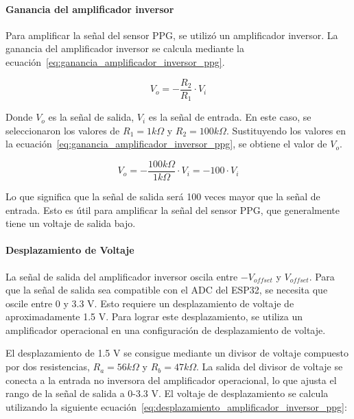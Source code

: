         \paragraph{Ganancia del amplificador inversor}
        Para amplificar la señal del sensor PPG, se utilizó un amplificador inversor. La ganancia del amplificador inversor se calcula mediante la ecuación~\ref{eq:ganancia_amplificador_inversor_ppg}.

        \begin{equation}
            \label{eq:ganancia_amplificador_inversor_ppg}
            V_o = - \frac{R_2}{R_1} \cdot V_i
        \end{equation}

        Donde $V_o$ es la señal de salida, $V_i$ es la señal de entrada. En este caso, se seleccionaron los valores de $R_1 = 1 k\Omega$ y $R_2 = 100 k\Omega$. Sustituyendo los valores en la ecuación~\ref{eq:ganancia_amplificador_inversor_ppg}, se obtiene el valor de $V_o$.

        \begin{equation}
            \label{eq:ganancia_amplificador_inversor_ppg_valor}
            V_o = - \frac{100k\Omega}{1k\Omega} \cdot V_i = -100 \cdot V_i
        \end{equation}

        Lo que significa que la señal de salida será 100 veces mayor que la señal de entrada. Esto es útil para amplificar la señal del sensor PPG, que generalmente tiene un voltaje de salida bajo.

        \paragraph{Desplazamiento de Voltaje}  
        La señal de salida del amplificador inversor oscila entre $-V_{offset}$ y $V_{offset}$. Para que la señal de salida sea compatible con el ADC del ESP32, se necesita que oscile entre 0 y 3.3 V. Esto requiere un desplazamiento de voltaje de aproximadamente 1.5 V. Para lograr este desplazamiento, se utiliza un amplificador operacional en una configuración de desplazamiento de voltaje. 

        El desplazamiento de 1.5 V se consigue mediante un divisor de voltaje compuesto por dos resistencias, $R_a = 56k\Omega$ y $R_b = 47k\Omega$. La salida del divisor de voltaje se conecta a la entrada no inversora del amplificador operacional, lo que ajusta el rango de la señal de salida a 0-3.3 V. El voltaje de desplazamiento se calcula utilizando la siguiente ecuación~\ref{eq:desplazamiento_amplificador_inversor_ppg}:

